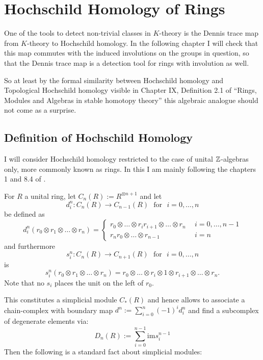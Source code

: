 \chapter{Hochschild Homology of Rings}
One of the tools to detect non-trivial classes in $K$-theory is the Dennis trace map from $K$-theory to Hochschild homology. In the following chapter
I will check that this map commutes with the induced involutions on the groups in question, so that the Dennis trace map is a detection tool for rings with
involution as well.

So at least by the formal similarity between Hochschild homology and Topological Hochschild homology visible in  Chapter IX, Definition 2.1
of ``Rings, Modules and Algebras in stable homotopy theory'' \cite{elmendorf2007rings} this algebraic analogue should not come as a surprise.

\section{Definition of Hochschild Homology}
I will consider Hochschild homology restricted to the case of unital $\mathbb{Z}$-algebras only, more commonly known as rings.
In this I am mainly following the chapters 1 and 8.4 of \cite{LCy}.

For $R$ a unital ring, let $C_n(R):=R^{\otimes n+1}$ and let
$$d_i^n\colon C_n(R) \rightarrow C_{n-1}(R) ~~~\mathrm{for ~~~} i = 0,\ldots,n$$
be defined as
$$d_i^n ( r_0 \otimes r_1 \otimes \ldots \otimes r_n ) = \begin{cases} r_0\otimes \ldots \otimes r_ir_{i+1} \otimes \ldots \otimes r_n & ~~ i= 0,\ldots,n-1\\
                                                                                       r_nr_0 \otimes \ldots \otimes r_{n-1} & ~~ i=n \end{cases}$$
and furthermore
$$s_i^n\colon C_n(R) \rightarrow C_{n+1}(R) ~~~\mathrm{for ~~~} i = 0,\ldots,n$$
is
$$s_i^n (r_0 \otimes r_1 \otimes \ldots \otimes r_n) = r_0\otimes \ldots \otimes r_i \otimes 1 \otimes r_{i+1} \otimes \ldots \otimes r_n.$$
Note that no $s_i$ places the unit on the left of $r_0$.

This constitutes a simplicial module $C_*(R)$ and hence allows to associate a chain-complex with boundary
map $d^n := \sum\limits_{i=0}^n(-1)^i d_i^n$ and find a subcomplex of degenerate elements via:
$$D_n(R):=\sum\limits_{i=0}^{n-1} \mathrm{im} s_i^{n-1}$$
Then the following is a standard fact about simplicial modules:

